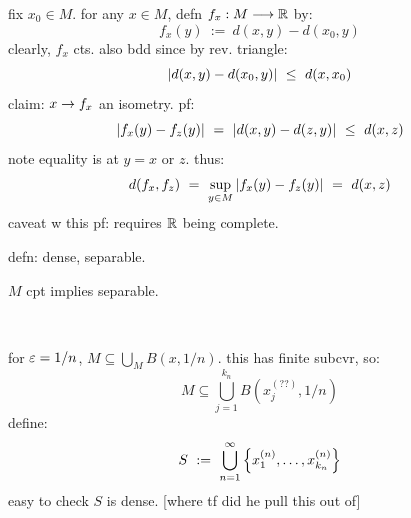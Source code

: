 fix $x_{0}\in M$. for any $x\in M$, defn $f_{x}:M\longrightarrow\mathbb{R}$ by:
\begin{equation*}
    f_{x}(y) \ := \ d(x,y)-d(x_{0},y)
\end{equation*}
clearly, $f_{x}$ cts. also bdd since by rev. triangle:
\begin{equation*}
    \abs{d(x,y)-d(x_{0},y)} \ \leq \ d(x,x_{0})
\end{equation*}
claim: $x\rightarrow f_{x}$ an isometry. pf:
\begin{equation*}
    \abs{f_{x}(y)-f_{z}(y)} \ = \ \abs{d(x,y)-d(z,y)} \ \leq \ d(x,z)
\end{equation*}
note equality is at $y=x$ or $z$. thus:
\begin{equation*}
    d(f_{x},f_{z}) \ = \ \sup_{y\in M}\abs{f_{x}(y)-f_{z}(y)} \ = \ d(x,z)
\end{equation*}
caveat w this pf: requires $\mathbb{R}$ being complete.

\newpage
defn: dense, separable.
\begin{lm}
	$M$ cpt implies separable.
\end{lm} \

\begin{pf}[source=Primary Source Material]
    for $\varepsilon=1/n$, $M\subseteq\bigcup_{M}B(x,1/n)$.
	this has finite subcvr, so:
	\begin{equation*}
	    M \subseteq \bigcup_{j=1}^{k_{n}}B(x_{j}^{(??)},1/n)
	\end{equation*}
	define:
	\begin{equation*}
	    S \ := \ \bigcup_{n=1}^{\infty}\set{x_{1}^{(n)},\dots,x_{k_{n}}^{(n)}}
	\end{equation*}
	easy to check $S$ is dense. [where tf did he pull this out of]
\end{pf}



